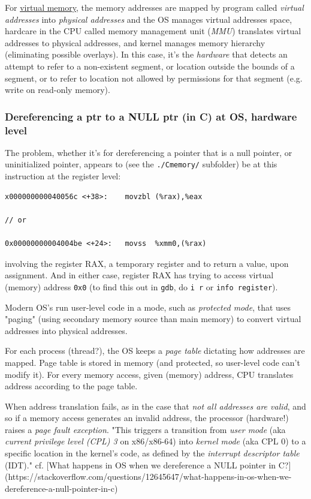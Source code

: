 \documentclass[10pt]{amsart}
\begin{document}
For \href{https://en.wikipedia.org/wiki/Virtual_memory}{virtual memory}, the memory addresses are mapped by program called \emph{virtual addresses} into \emph{physical addresses} and the OS manages virtual addresses space, hardcare in the CPU called memory management unit (\emph{MMU}) translates virtual addresses to physical addresses, and kernel manages memory hierarchy (eliminating possible overlays).  In this case, it's the \emph{hardware} that detects an attempt to refer to a non-existent segment, or location outside the bounds of a segment, or to refer to location not allowed by permissions for that segment (e.g. write on read-only memory).   

\subsubsection{Dereferencing a ptr to a NULL ptr (in C) at OS, hardware level}


The problem, whether it's for dereferencing a pointer that is a null pointer, or uninitialized pointer, appears to (see the \verb|./Cmemory/| subfolder) be at this instruction at the register level:  

\begin{lstlisting}
x000000000040056c <+38>:	movzbl (%rax),%eax

// or 

0x00000000004004be <+24>:	movss  %xmm0,(%rax)  
\end{lstlisting}

involving the register RAX, a temporary register and to return a value, upon assignment.  And in either case, register RAX has trying to access virtual (memory) address \verb|0x0| (to find this out in \verb|gdb|, do \verb|i r| or \verb|info register|).  

Modern OS's run user-level code in a mode, such as \emph{protected mode}, that uses "paging" (using secondary memory source than main memory) to convert virtual addresses into physical addresses.  

For each process (thread?), the OS keeps a \emph{page table} dictating how addresses are mapped.  Page table is stored in memory (and protected, so user-level code can't modify it).  For every memory access, given (memory) address, CPU translates address according to the page table.  

When address translation fails, as in the case that \emph{not all addresses are valid}, and so if a memory access generates an invalid address, the processor (hardware!) raises a \emph{page fault exception}.  "This triggers a transition from \emph{user mode} (aka \emph{current privilege level (CPL) 3} on x86/x86-64) into \emph{kernel mode} (aka CPL 0) to a specific location in the kernel's code, as defined by the \emph{interrupt descriptor table} (IDT)."  cf. [What happens in OS when we dereference a NULL pointer in C?](https://stackoverflow.com/questions/12645647/what-happens-in-os-when-we-dereference-a-null-pointer-in-c)
\end{document}
